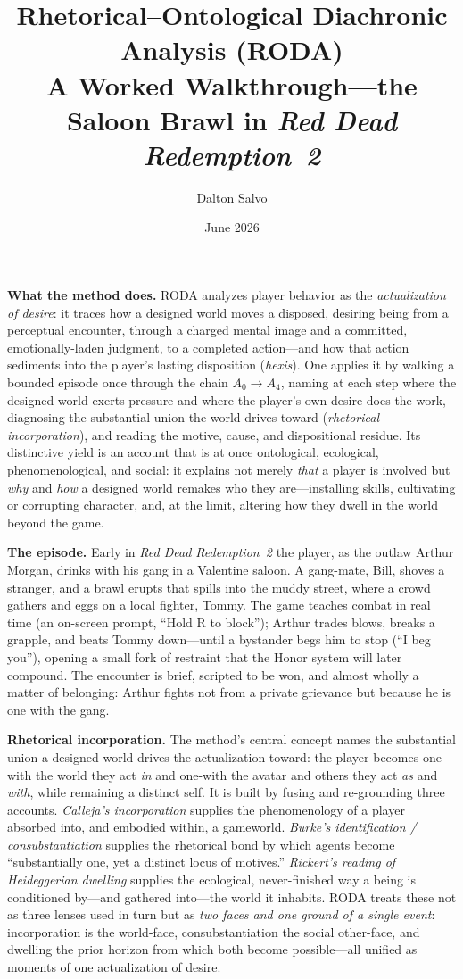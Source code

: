 \documentclass[11pt]{article}
\title{\textbf{Rhetorical--Ontological Diachronic Analysis (RODA)}\\[5pt]
\large A Worked Walkthrough---the Saloon Brawl in \emph{Red Dead Redemption~2}}
\author{Dalton Salvo}
\date{June 2026}
\newcommand{\too}{\ensuremath{\to}}
\begin{document}
\maketitle

\noindent\textbf{What the method does.} RODA analyzes player behavior as the \emph{actualization of desire}: it traces how a designed world moves a disposed, desiring being from a perceptual encounter, through a charged mental image and a committed, emotionally-laden judgment, to a completed action---and how that action sediments into the player's lasting disposition (\textit{hexis}). One applies it by walking a bounded episode once through the chain $A_0\too A_4$, naming at each step where the designed world exerts pressure and where the player's own desire does the work, diagnosing the substantial union the world drives toward (\emph{rhetorical incorporation}), and reading the motive, cause, and dispositional residue. Its distinctive yield is an account that is at once ontological, ecological, phenomenological, and social: it explains not merely \emph{that} a player is involved but \emph{why} and \emph{how} a designed world remakes who they are---installing skills, cultivating or corrupting character, and, at the limit, altering how they dwell in the world beyond the game.

\medskip
\noindent\textbf{The episode.} Early in \emph{Red Dead Redemption~2} the player, as the outlaw Arthur Morgan, drinks with his gang in a Valentine saloon. A gang-mate, Bill, shoves a stranger, and a brawl erupts that spills into the muddy street, where a crowd gathers and eggs on a local fighter, Tommy. The game teaches combat in real time (an on-screen prompt, ``Hold R to block''); Arthur trades blows, breaks a grapple, and beats Tommy down---until a bystander begs him to stop (``I beg you''), opening a small fork of restraint that the Honor system will later compound. The encounter is brief, scripted to be won, and almost wholly a matter of belonging: Arthur fights not from a private grievance but because he is one with the gang.

\medskip
\noindent\textbf{Rhetorical incorporation.} The method's central concept names the substantial union a designed world drives the actualization toward: the player becomes one-with the world they act \emph{in} and one-with the avatar and others they act \emph{as} and \emph{with}, while remaining a distinct self. It is built by fusing and re-grounding three accounts. \emph{Calleja's incorporation} supplies the phenomenology of a player absorbed into, and embodied within, a gameworld. \emph{Burke's identification / consubstantiation} supplies the rhetorical bond by which agents become ``substantially one, yet a distinct locus of motives.'' \emph{Rickert's reading of Heideggerian dwelling} supplies the ecological, never-finished way a being is conditioned by---and gathered into---the world it inhabits. RODA treats these not as three lenses used in turn but as \emph{two faces and one ground of a single event}: incorporation is the world-face, consubstantiation the social other-face, and dwelling the prior horizon from which both become possible---all unified as moments of one actualization of desire.
\end{document}
